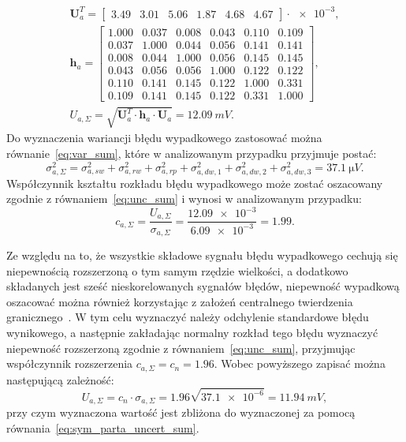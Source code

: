\begin{gather}
\mathbf{U}_{a}^{T} =
\begin{bmatrix}
3.49 & 3.01 & 5.06 & 1.87 & 4.68 & 4.67
\end{bmatrix} \cdot \num{e-3}
\label{eq:sym_parta_uncert_vector_val}, \\
\mathbf{h}_{a} =
\begin{bmatrix}
1.000 & 0.037 & 0.008 & 0.043 & 0.110 & 0.109 \\
0.037 & 1.000 & 0.044 & 0.056 & 0.141 & 0.141 \\
0.008 & 0.044 & 1.000 & 0.056 & 0.145 & 0.145 \\
0.043 & 0.056 & 0.056 & 1.000 & 0.122 & 0.122 \\
0.110 & 0.141 & 0.145 & 0.122 & 1.000 & 0.331 \\
0.109 & 0.141 & 0.145 & 0.122 & 0.331 & 1.000
\end{bmatrix}
\label{eq:sym_parta_uncert_coher_val}, \\
U_{a,\Sigma} = \sqrt{\mathbf{U}_{a}^{T} \cdot \mathbf{h}_{a} \cdot \mathbf{U}_{a}} = \qty{12.09}{mV} \label{eq:sym_parta_uncert_value_a}.
\end{gather}
Do wyznaczenia wariancji błędu wypadkowego zastosować można równanie~\eqref{eq:var_sum}, które w analizowanym przypadku przyjmuje postać:
\begin{equation}
\sigma_{a,\Sigma}^{2} = \sigma_{a,sw}^{2} + \sigma_{a,rw}^{2} + \sigma_{a,rp}^{2} + \sigma_{a,dw,1}^{2} + \sigma_{a,dw,2}^{2} + \sigma_{a,dw,3}^{2} = \qty{37.1}{\micro V} \label{eq:sym_parta_var_sum}.
\end{equation}
Współczynnik kształtu rozkładu błędu wypadkowego może zostać oszacowany zgodnie z równaniem~\eqref{eq:unc_sum} i wynosi w analizowanym przypadku:
\begin{equation}
c_{a,\Sigma} = \frac{U_{a,\Sigma}}{\sigma_{a,\Sigma}} = \frac{\num{12.09e-3}}{\num{6.09e-3}} = 1.99 \label{eq:sym_parta_uncert_factor}.
\end{equation}

Ze względu na to, że wszystkie składowe sygnału błędu wypadkowego cechują się niepewnością rozszerzoną o tym samym rzędzie wielkości, a dodatkowo składanych jest sześć nieskorelowanych sygnałów błędów, niepewność wypadkową oszacować można również korzystając z założeń centralnego twierdzenia granicznego~\cite{jcgm_guide}. W tym celu wyznaczyć należy odchylenie standardowe błędu wynikowego, a następnie zakładając normalny rozkład tego błędu wyznaczyć niepewność rozszerzoną zgodnie z równaniem~\eqref{eq:unc_sum}, przyjmując współczynnik rozszerzenia $c_{a,\Sigma} = c_{n} = 1.96$. Wobec powyższego zapisać można następującą zależność:
\begin{equation}
U_{a,\Sigma} = c_{n} \cdot \sigma_{a,\Sigma} = 1.96 \sqrt{\num{37.1e-6}} = \qty{11.94}{mV} \label{eq:sym_parta_uncert_value_b},
\end{equation}
przy czym wyznaczona wartość jest zbliżona do wyznaczonej za pomocą równania~\eqref{eq:sym_parta_uncert_sum}.

